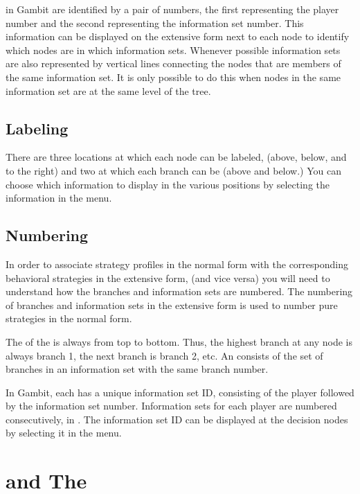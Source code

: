  in Gambit are identified by a 
pair of numbers, the first representing the player number and the 
second representing the information set number.  This information 
can be displayed on the extensive form next to each node to identify 
which nodes are in which information sets.  
Whenever possible information sets are also represented 
by vertical lines connecting the nodes that are members of the same information set.  
It is only possible to do this when nodes 
in the same information set are at the same level of the tree.  

\subsection{Labeling}
There are three locations at which each node can be labeled, (above, 
below, and to the right) and two at which each branch can be 
 (above and below.) You can choose which information to display 
in the various positions by selecting the information in 
the   menu.  

\subsection{Numbering}\label{infosetnumbering}
In order  to associate strategy profiles in the 
normal form with the corresponding behavioral strategies in the extensive 
form, (and vice versa) you will need to understand how the branches and 
information sets are numbered.  The numbering of branches and information 
sets in the extensive form  is used to number pure strategies in the normal form.  

The  of the  is always
from top to bottom.  Thus, the highest branch at any node is always branch
1, the next branch is branch 2, etc. An  consists of 
the set of branches in an information set with the same branch number.  

In Gambit, each  has a unique 
information set ID, consisting of the player followed by the information 
set number.  Information sets for each player are numbered consecutively, 
in .  
The information set ID can be displayed at the decision nodes by selecting 
it in the  menu.  

\section{ and The }

